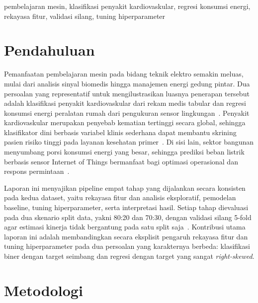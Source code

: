 \documentclass[conference]{IEEEtran}
\begin{document}
\begin{IEEEkeywords}
pembelajaran mesin, klasifikasi penyakit kardiovaskular, regresi konsumsi energi, rekayasa fitur, validasi silang, tuning hiperparameter
\end{IEEEkeywords}

\section{Pendahuluan}
Pemanfaatan pembelajaran mesin pada bidang teknik elektro semakin meluas, mulai dari analisis sinyal biomedis hingga manajemen energi gedung pintar. Dua persoalan yang representatif untuk mengilustrasikan luasnya penerapan tersebut adalah klasifikasi penyakit kardiovaskular dari rekam medis tabular dan regresi konsumsi energi peralatan rumah dari pengukuran sensor lingkungan~\cite{Tien2022,Ahmed2022}. Penyakit kardiovaskular merupakan penyebab kematian tertinggi secara global, sehingga klasifikator dini berbasis variabel klinis sederhana dapat membantu skrining pasien risiko tinggi pada layanan kesehatan primer~\cite{WHO2023,Ahmed2022}. Di sisi lain, sektor bangunan menyumbang porsi konsumsi energi yang besar, sehingga prediksi beban listrik berbasis sensor Internet of Things bermanfaat bagi optimasi operasional dan respons permintaan~\cite{Candanedo2017,Bourdeau2019,Somu2021}.

Laporan ini menyajikan pipeline empat tahap yang dijalankan secara konsisten pada kedua dataset, yaitu rekayasa fitur dan analisis eksploratif, pemodelan baseline, tuning hiperparameter, serta interpretasi hasil. Setiap tahap dievaluasi pada dua skenario split data, yakni 80:20 dan 70:30, dengan validasi silang 5-fold agar estimasi kinerja tidak bergantung pada satu split saja~\cite{Raschka2018,Varoquaux2017}. Kontribusi utama laporan ini adalah membandingkan secara eksplisit pengaruh rekayasa fitur dan tuning hiperparameter pada dua persoalan yang karakternya berbeda: klasifikasi biner dengan target seimbang dan regresi dengan target yang sangat \textit{right-skewed}.

\section{Metodologi}
\end{document}
